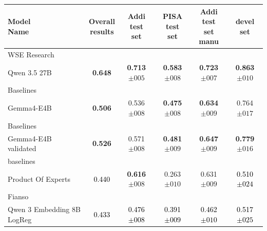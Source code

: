 \begin{tabularx}{\textwidth}{X | c c c c c}
\hline
\makecell[b]{\textbf{Model} \\ \textbf{Name}} & \makecell[b]{\textbf{Overall} \\ \textbf{results}} & \makecell[b]{\textbf{Addi} \\ \textbf{test} \\ \textbf{set}} & \makecell[b]{\textbf{PISA} \\ \textbf{test} \\ \textbf{set}} & \makecell[b]{\textbf{Addi} \\ \textbf{test} \\ \textbf{set} \\ \textbf{manu}} & \makecell[b]{\textbf{devel} \\ \textbf{set}} \\
\hline
WSE Research\\\subcatarrow{}Qwen 3.5 27B & \textbf{\textcolor{BrickRed}{0.648}} & \textbf{\textcolor{BrickRed}{0.713$\pm{}005$}} & \textbf{\textcolor{BrickRed}{0.583$\pm{}008$}} & \textbf{\textcolor{BrickRed}{0.723$\pm{}007$}} & \textbf{\textcolor{BrickRed}{0.863$\pm{}010$}} \\
Baselines\\\subcatarrow{}Gemma4-E4B & \textbf{\textcolor{White!50!BrickRed}{0.506}} & \textcolor{White!50!BrickRed}{0.536$\pm{}008$} & \textbf{\textcolor{White!50!BrickRed}{0.475$\pm{}008$}} & \textbf{\textcolor{White!50!BrickRed}{0.634$\pm{}009$}} & \textcolor{White!50!BrickRed}{0.764$\pm{}017$} \\
Baselines\\\subcatarrow{}Gemma4-E4B validated & \textbf{\textcolor{White!50!BrickRed}{0.526}} & \textcolor{White!50!BrickRed}{0.571$\pm{}008$} & \textbf{\textcolor{White!50!BrickRed}{0.481$\pm{}009$}} & \textbf{\textcolor{White!50!BrickRed}{0.647$\pm{}009$}} & \textbf{\textcolor{White!50!BrickRed}{0.779$\pm{}016$}} \\
baselines\\\subcatarrow{}Product Of Experts & \textcolor{Black}{0.440} & \textbf{\textcolor{White!50!BrickRed}{0.616$\pm{}008$}} & \textcolor{White!50!NavyBlue}{0.263$\pm{}010$} & \textcolor{White!50!BrickRed}{0.631$\pm{}009$} & \textcolor{Black}{0.510$\pm{}024$} \\
Fianso\\\subcatarrow{}Qwen 3 Embedding 8B LogReg & \textcolor{Black}{0.433} & \textcolor{Black}{0.476$\pm{}008$} & \textcolor{Black}{0.391$\pm{}009$} & \textcolor{Black}{0.462$\pm{}010$} & \textcolor{Black}{0.517$\pm{}025$} \\

\end{tabularx}
